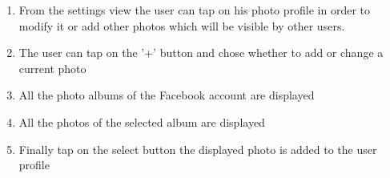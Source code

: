 \begin{enumerate}
\item From the settings view the user can tap on his photo profile in order to modify it or add other photos which will be visible by other users.

\item The user can tap on the '+' button and chose whether to add or change a current photo

\item All the photo albums of the Facebook account are displayed 

\item  All the photos of the selected album are displayed

\item  Finally tap on the select button the displayed photo is added to the user profile

\end{enumerate}